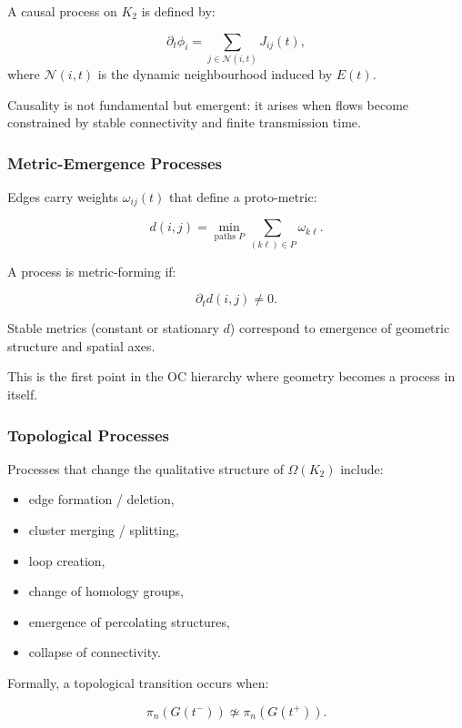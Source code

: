 A causal process on $K_2$ is defined by:

\[
\partial_t \phi_i = \sum_{j \in \mathcal{N}(i,t)} J_{ij}(t),
\]
where $\mathcal{N}(i,t)$ is the dynamic neighbourhood induced by $E(t)$.

Causality is not fundamental but emergent:
it arises when flows become constrained by stable connectivity and finite
transmission time.

\subsubsection{Metric-Emergence Processes}

Edges carry weights $\omega_{ij}(t)$ that define a proto-metric:

\[
d(i,j) = \min_{\text{paths }P} \sum_{(k\ell)\in P} \omega_{k\ell}.
\]

A process is metric-forming if:

\[
\partial_t d(i,j) \neq 0.
\]

Stable metrics (constant or stationary $d$) correspond to emergence of
geometric structure and spatial axes.

This is the first point in the OC hierarchy where geometry becomes a
process in itself.

\subsubsection{Topological Processes}

Processes that change the qualitative structure of $\Omega(K_2)$ include:

\begin{itemize}
    \item edge formation / deletion,
    \item cluster merging / splitting,
    \item loop creation,
    \item change of homology groups,
    \item emergence of percolating structures,
    \item collapse of connectivity.
\end{itemize}

Formally, a topological transition occurs when:

\[
\pi_n(G(t^-)) \not\simeq \pi_n(G(t^+)).
\]

